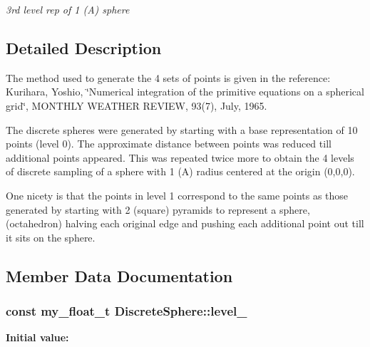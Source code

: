 \begin{CompactItemize}
\begin{CompactList}\small\item\em 3rd level rep of 1 (A) sphere \item\end{CompactList}\end{CompactItemize}


\subsection{Detailed Description}
The method used to generate the 4 sets of points is given in the reference: Kurihara, Yoshio, \char`\"{}Numerical integration of the primitive equations on a spherical grid\char`\"{}, MONTHLY WEATHER REVIEW, 93(7), July, 1965.

The discrete spheres were generated by starting with a base representation of 10 points (level 0). The approximate distance between points was reduced till additional points appeared. This was repeated twice more to obtain the 4 levels of discrete sampling of a sphere with 1 (A) radius centered at the origin (0,0,0).

One nicety is that the points in level 1 correspond to the same points as those generated by starting with 2 (square) pyramids to represent a sphere, (octahedron) halving each original edge and pushing each additional point out till it sits on the sphere. 



\subsection{Member Data Documentation}
\subsubsection{\setlength{\rightskip}{0pt plus 5cm}const my\_\-float\_\-t \bf{Discrete\-Sphere::level\_}\hspace{0.3cm}{\tt  [static, private]}}\label{classSimSite3D_1_1DiscreteSphere_53fc82a740852de5f8b12e96487c6e90}


\textbf{Initial value:}

